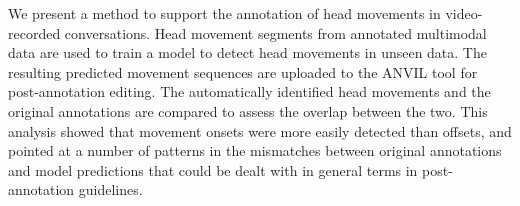 We present a method to support the annotation of head movements in video-recorded conversations. Head movement segments from annotated multimodal data are used to train a model to detect head movements in unseen data. The resulting predicted movement sequences  are uploaded to the ANVIL tool for post-annotation editing. The automatically identified head movements and the original annotations are compared to assess the overlap between the two. This analysis showed that movement onsets were more easily detected than offsets, and pointed at a number of patterns in the mismatches between original annotations and model predictions that could be dealt with in general terms in post-annotation guidelines.
